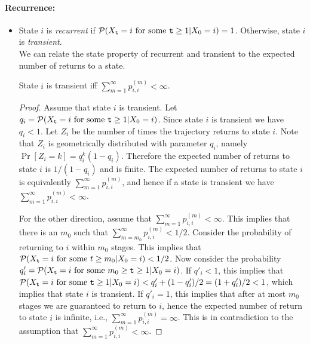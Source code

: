 \paragraph{Recurrence:}
\begin{itemize}
\item
State $i$ is \textit{recurrent} if ${\cal P}({X_{\tt t}} = i{
\textrm{ for some }}{\tt t} \ge 1|{X_0} = i) = 1$. Otherwise, state $i$ is
\textit{transient}.\\
We can relate the state property of recurrent and transient to the
expected number of returns to a state.

\begin{claim}
State $i$ is transient iff $\sum\nolimits_{m = 1}^\infty
{p_{i,i}^{(m)}}  < \infty $.
\end{claim}

\begin{proof}
Assume that state $i$ is transient. Let $q_i={\cal P}({X_{\tt t}} =
i{ \textrm{ for some }}{\tt t} \ge 1|{X_0} = i) $. Since state $i$ is
transient we have $q_i<1$. Let $Z_i$ be the number of times the
trajectory returns to state $i$. Note that $Z_i$ is geometrically
distributed with parameter $q_i$, namely $\Pr[Z_i=k]=q_i^k (1-q_i)$.
Therefore the expected number of returns to state $i$ is $1/(1-q_i)$
and is finite.
%
The expected number of returns to state $i$ is equivalently
$\sum\nolimits_{m = 1}^\infty {p_{i,i}^{(m)}} $, and hence if a
state is transient we have $\sum\nolimits_{m = 1}^\infty
{p_{i,i}^{(m)}}  < \infty $.

For the other direction, assume that $\sum\nolimits_{m = 1}^\infty
{p_{i,i}^{(m)}}  < \infty $. This implies that there is an $m_0$
such that $\sum\nolimits_{m = m_0}^\infty {p_{i,i}^{(m)}}  < 1/2$.
Consider the probability of returning to $i$ within $m_0$ stages.
This implies that ${\cal P}({X_{\tt t}} = i{ \textrm{ for some }}t
\ge m_0|{X_0} = i)< 1/2$. Now consider the probability $q'_i={\cal
P}({X_{\tt t}} = i{ \textrm{ for some }}m_0\geq {\tt t} \ge 1|{X_0} = i) $.
%
If $q'_i<1$, this implies that ${\cal P}({X_{\tt t}} = i{ \textrm{
for some }}{\tt t} \ge 1|{X_0} = i)<q'_i +(1-q'_i)/2=(1+q'_i)/2<1$, which
implies that state $i$ is transient.
%
If $q'_i=1$, this implies that after at most $m_0$ stages we are
guaranteed to return to $i$, hence the expected number of return to
state $i$ is infinite, i.e., $\sum\nolimits_{m = 1}^\infty
{p_{i,i}^{(m)}}  = \infty $. This is in contradiction to the
assumption that $\sum\nolimits_{m = 1}^\infty {p_{i,i}^{(m)}}  <
\infty $.
\end{proof}



\end{itemize}
